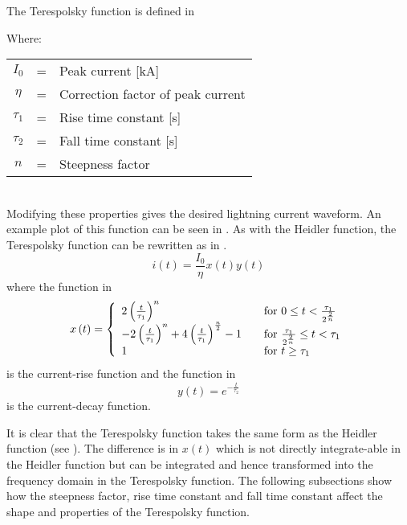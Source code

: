 The Terespolsky function is defined in 

Where: \\
\begin{tabular}{cll}
    $I_0$ & = & Peak current [kA] \\
    $\eta$ & = & Correction factor of peak current \\
    $\tau_1$ & = & Rise time constant [s] \\
    $\tau_2$ & = & Fall time constant [s] \\
    $n$ & = & Steepness factor
\end{tabular}\\

Modifying these properties gives the desired lightning current waveform. An example plot of this function can be seen in .
As with the Heidler function, the Terespolsky function can be rewritten as in .
\begin{equation}
i(t) = \frac{I_0}{\eta} x \left( t \right) y \left( t \right)
\label{eqn:TFSmall}
\end{equation}
where the function in 
\begin{equation}
    x \left( t \right) = \left\{
      \begin{array}{l l}
        2 \left( \frac{t}{\tau_1} \right )^n & \quad \textrm{for $0 \leq t < \frac{\tau_1}{2^{\frac{2}{n}}}$} \\
        -2 \left( \frac{t}{\tau_1} \right )^n +4 \left( \frac{t}{\tau_1} \right )^{\frac{n}{2}} -1 & \quad \textrm{for $\frac{\tau_1}{2^{\frac{2}{n}}} \leq t < \tau_1$} \\
        1 & \quad \textrm{for $t \geq \tau_1$}
      \end{array} \right.
    \label{eqn:TFrise}
\end{equation}
is the current-rise function and the function in 
\begin{equation}
    y \left( t \right) = e^{-\frac{t}{\tau_2}}
    \label{eqn:TFfall}
\end{equation}
is the current-decay function.

It is clear that the Terespolsky function takes the same form as the Heidler function (see ). The difference is in $x \left( t \right)$ which is not directly integrate-able in the Heidler function but can be integrated and hence transformed into the frequency domain in the Terespolsky function. The following subsections show how the steepness factor, rise time constant and fall time constant affect the shape and properties of the Terespolsky function.

